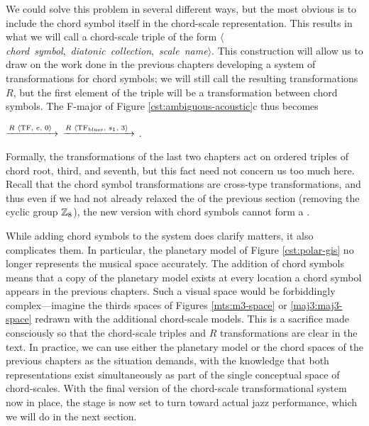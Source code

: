 We could solve this problem in several different ways, but the most obvious is
to include the chord symbol itself in the chord-scale representation. This
results in what we will call a chord-scale triple of the form
\mbox{$\langle$\emph{chord symbol}, \emph{diatonic collection}, \emph{scale
    name}$\rangle$}. This construction will allow us to draw on the work done
in the previous chapters developing a system of transformations for chord
symbols; we will still call the resulting transformations $R$, but the first
element of the triple will be a transformation between chord
symbols. The F-major \tfo of Figure \ref{cst:ambiguous-acoustic}c
thus becomes \\
{ \centering {}
  $\xrightarrow{R\text{ \mbox{\ensuremath{\langle}TF, $e$, $0$\ensuremath{\rangle}} }}$ 
  $\xrightarrow{R\text{ \mbox{\ensuremath{\langle}TF\textsubscript{blues}, $s_1$, $3$\ensuremath{\rangle}} }}$
  .
  \par
}
\noindent Formally, the transformations of the last two chapters act on
ordered triples of chord root, third, and seventh, but this fact need not
concern us too much here. Recall that the chord symbol transformations are
cross-type transformations, and thus even if we had not already relaxed the
\gis of the previous section (removing the cyclic group $\mathbb{Z}_8$), the new
version with chord symbols cannot form a \gis.

While adding chord symbols to the system does clarify matters, it also
complicates them. In particular, the planetary model of Figure
\ref{cst:polar-gis} no longer represents the musical space accurately. The
addition of chord symbols means that a copy of the planetary model exists at
every location a chord symbol appears in the previous chapters.
Such a visual space would be forbiddingly complex---imagine the thirds spaces
of Figures \ref{mts:m3-space} or \ref{maj3:maj3-space} redrawn with the
additional chord-scale models. This is a sacrifice made consciously so that
the chord-scale triples and $R$ transformations are clear in the text. In
practice, we can use either the planetary model or the chord spaces of the
previous chapters as the situation demands, with the knowledge that both
representations exist simultaneously as part of the single conceptual space of
chord-scales. With the final version of the chord-scale transformational
system now in place, the stage is now set to turn toward actual jazz performance,
which we will do in the next section.


